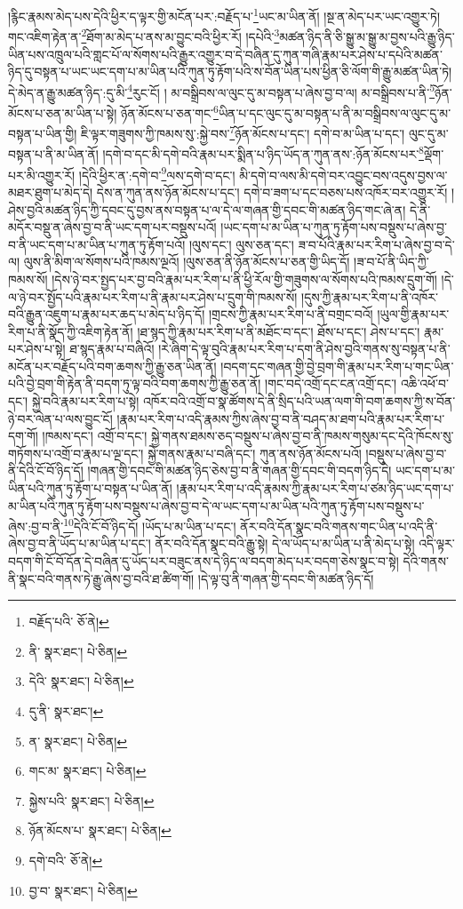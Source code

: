།རྙིང་རྣམས་མེད་པས་དེའི་ཕྱིར་ད་ལྟར་གྱི་མངོན་པར་:བརྗོད་པ་\footnote{བརྗོད་པའི་  ཅོ་ནེ། }ཡང་མ་ཡིན་ནོ། །སྔ་ན་མེད་པར་ཡང་འགྱུར་ཏེ། གང་འཇིག་རྟེན་ན་\footnote{ནི་  སྣར་ཐང་།  པེ་ཅིན། }ཐོག་མ་མེད་པ་ནས་མ་བྱུང་བའི་ཕྱིར་རོ། །དཔེའི་\footnote{དེའི་  སྣར་ཐང་།  པེ་ཅིན། }མཚན་ཉིད་ནི་ཅི་སྒྱུ་མ་སྒྱུ་མ་བྱས་པའི་རྒྱུ་ཉིད་ཡིན་པས་འཁྲུལ་པའི་གླང་པོ་ལ་སོགས་པའི་རྒྱུར་འགྱུར་བ་དེ་བཞིན་དུ་ཀུན་གཞི་རྣམ་པར་ཤེས་པ་དཔེའི་མཚན་ཉིད་དུ་བསྟན་པ་ཡང་ཡང་དག་པ་མ་ཡིན་པའི་ཀུན་ཏུ་རྟོག་པའི་ས་བོན་ཡིན་པས་ཕྱིན་ཅི་ལོག་གི་རྒྱུ་མཚན་ཡིན་ཏེ། དེ་མེད་ན་རྒྱུ་མཚན་ཉིད་:དུ་མི་\footnote{དུ་ནི་  སྣར་ཐང་། }རུང་ངོ། །
མ་བསྒྲིབས་ལ་ལུང་དུ་མ་བསྟན་པ་ཞེས་བྱ་བ་ལ། མ་བསྒྲིབས་པ་ནི་\footnote{ན་  སྣར་ཐང་།  པེ་ཅིན། }ཉོན་མོངས་པ་ཅན་མ་ཡིན་པ་སྟེ། ཉོན་མོངས་པ་ཅན་གང་\footnote{གང་མ་  སྣར་ཐང་།  པེ་ཅིན། }ཡིན་པ་དང་ལུང་དུ་མ་བསྟན་པ་ནི་མ་བསྒྲིབས་ལ་ལུང་དུ་མ་བསྟན་པ་ཡིན་གྱི། ཇི་ལྟར་གཟུགས་ཀྱི་ཁམས་སུ་:སྐྱེ་བས་\footnote{སྐྱེས་པའི་  སྣར་ཐང་།  པེ་ཅིན། }ཉོན་མོངས་པ་དང་། དགེ་བ་མ་ཡིན་པ་དང་། ལུང་དུ་མ་བསྟན་པ་ནི་མ་ཡིན་ནོ། །དགེ་བ་དང་མི་དགེ་བའི་རྣམ་པར་སྨིན་པ་ཉིད་ཡོད་ན་ཀུན་ནས་:ཉོན་མོངས་པར་\footnote{ཉོན་མོངས་པ་  སྣར་ཐང་།  པེ་ཅིན། }ལྡོག་པར་མི་འགྱུར་རོ། །དེའི་ཕྱིར་ན་:དགེ་བ་\footnote{དགེ་བའི་  ཅོ་ནེ། }ལས་དགེ་བ་དང་། མི་དགེ་བ་ལས་མི་དགེ་བར་འབྱུང་བས་འདུས་བྱས་ལ་མཐར་ཐུག་པ་མེད་དེ། དེས་ན་ཀུན་ནས་ཉོན་མོངས་པ་དང་། དགེ་བ་ཟག་པ་དང་བཅས་པས་འཁོར་བར་འགྱུར་རོ། །ཤེས་བྱའི་མཚན་ཉིད་ཀྱི་དབང་དུ་བྱས་ནས་བསྟན་པ་ལ་དེ་ལ་གཞན་གྱི་དབང་གི་མཚན་ཉིད་གང་ཞེ་ན། དེ་ནི་མདོར་བསྡུ་ན་ཞེས་བྱ་བ་ནི་ཡང་དག་པར་བསྡུས་པའོ། །ཡང་དག་པ་མ་ཡིན་པ་ཀུན་ཏུ་རྟོག་པས་བསྡུས་པ་ཞེས་བྱ་བ་ནི་ཡང་དག་པ་མ་ཡིན་པ་ཀུན་ཏུ་རྟོག་པའོ། །ལུས་དང་། ལུས་ཅན་དང་། ཟ་བ་པོའི་རྣམ་པར་རིག་པ་ཞེས་བྱ་བ་དེ་ལ། ལུས་ནི་མིག་ལ་སོགས་པའི་ཁམས་ལྔའོ། །ལུས་ཅན་ནི་ཉོན་མོངས་པ་ཅན་གྱི་ཡིད་དོ། །ཟ་བ་པོ་ནི་ཡིད་ཀྱི་ཁམས་སོ། །དེས་ཉེ་བར་སྤྱད་པར་བྱ་བའི་རྣམ་པར་རིག་པ་ནི་ཕྱི་རོལ་གྱི་གཟུགས་ལ་སོགས་པའི་ཁམས་དྲུག་གོ། །དེ་ལ་ཉེ་བར་སྤྱོད་པའི་རྣམ་པར་རིག་པ་ནི་རྣམ་པར་ཤེས་པ་དྲུག་གི་ཁམས་སོ། །དུས་ཀྱི་རྣམ་པར་རིག་པ་ནི་འཁོར་བའི་རྒྱུན་འཇུག་པ་རྣམ་པར་ཆད་པ་མེད་པ་ཉིད་དོ། །གྲངས་ཀྱི་རྣམ་པར་རིག་པ་ནི་བགྲང་བའོ། །ཡུལ་གྱི་རྣམ་པར་རིག་པ་ནི་སྣོད་ཀྱི་འཇིག་རྟེན་ནོ། །ཐ་སྙད་ཀྱི་རྣམ་པར་རིག་པ་ནི་མཐོང་བ་དང་། ཐོས་པ་དང་། ཤེས་པ་དང་། རྣམ་པར་ཤེས་པ་སྟེ། ཐ་སྙད་རྣམ་པ་བཞིའོ། །རེ་ཞིག་དེ་ལྟ་བུའི་རྣམ་པར་རིག་པ་དག་ནི་ཤེས་བྱའི་གནས་སུ་བསྟན་པ་ནི་མངོན་པར་བརྗོད་པའི་བག་ཆགས་ཀྱི་རྒྱུ་ཅན་ཡིན་ནོ། །བདག་དང་གཞན་གྱི་བྱེ་བྲག་གི་རྣམ་པར་རིག་པ་གང་ཡིན་པའི་བྱེ་བྲག་གི་རྟེན་ནི་བདག་ཏུ་ལྟ་བའི་བག་ཆགས་ཀྱི་རྒྱུ་ཅན་ནོ། །གང་བདེ་འགྲོ་དང་ངན་འགྲོ་དང་། འཆི་འཕོ་བ་དང་། སྐྱེ་བའི་རྣམ་པར་རིག་པ་སྟེ། འཁོར་བའི་འགྲོ་བ་སྣ་ཚོགས་དེ་ནི་སྲིད་པའི་ཡན་ལག་གི་བག་ཆགས་ཀྱི་ས་བོན་ཉེ་བར་ལེན་པ་ལས་བྱུང་ངོ། །རྣམ་པར་རིག་པ་འདི་རྣམས་ཀྱིས་ཞེས་བྱ་བ་ནི་བཤད་མ་ཐག་པའི་རྣམ་པར་རིག་པ་དག་གོ། །ཁམས་དང་། འགྲོ་བ་དང་། སྐྱེ་གནས་ཐམས་ཅད་བསྡུས་པ་ཞེས་བྱ་བ་ནི་ཁམས་གསུམ་དང་དེའི་ཁོངས་སུ་གཏོགས་པ་འགྲོ་བ་རྣམ་པ་ལྔ་དང་། སྐྱེ་གནས་རྣམ་པ་བཞི་དང་། ཀུན་ནས་ཉོན་མོངས་པའོ། །བསྡུས་པ་ཞེས་བྱ་བ་ནི་དེའི་ངོ་བོ་ཉིད་དོ། །གཞན་གྱི་དབང་གི་མཚན་ཉིད་ཅེས་བྱ་བ་ནི་གཞན་གྱི་དབང་གི་བདག་ཉིད་དེ། ཡང་དག་པ་མ་ཡིན་པའི་ཀུན་ཏུ་རྟོག་པ་བསྟན་པ་ཡིན་ནོ། །རྣམ་པར་རིག་པ་འདི་རྣམས་ཀྱི་རྣམ་པར་རིག་པ་ཙམ་ཉིད་ཡང་དག་པ་མ་ཡིན་པའི་ཀུན་ཏུ་རྟོག་པས་བསྡུས་པ་ཞེས་བྱ་བ་དེ་ལ་ཡང་དག་པ་མ་ཡིན་པའི་ཀུན་ཏུ་རྟོག་པས་བསྡུས་པ་ཞེས་:བྱ་བ་ནི་\footnote{བྱ་བ་  སྣར་ཐང་།  པེ་ཅིན། }དེའི་ངོ་བོ་ཉིད་དོ། །ཡོད་པ་མ་ཡིན་པ་དང་། ནོར་བའི་དོན་སྣང་བའི་གནས་གང་ཡིན་པ་འདི་ནི་ཞེས་བྱ་བ་ནི་ཡོད་པ་མ་ཡིན་པ་དང་། ནོར་བའི་དོན་སྣང་བའི་རྒྱུ་སྟེ། དེ་ལ་ཡོད་པ་མ་ཡིན་པ་ནི་མེད་པ་སྟེ། འདི་ལྟར་བདག་གི་ངོ་བོ་དོན་དེ་བཞིན་དུ་ཡོད་པར་བཟུང་ནས་དེ་ཉིད་ལ་བདག་མེད་པར་བདག་ཅེས་སྣང་བ་སྟེ། དེའི་གནས་ནི་སྣང་བའི་གནས་ཏེ་རྒྱུ་ཞེས་བྱ་བའི་ཐ་ཚིག་གོ། །དེ་ལྟ་བུ་ནི་གཞན་གྱི་དབང་གི་མཚན་ཉིད་དོ། 